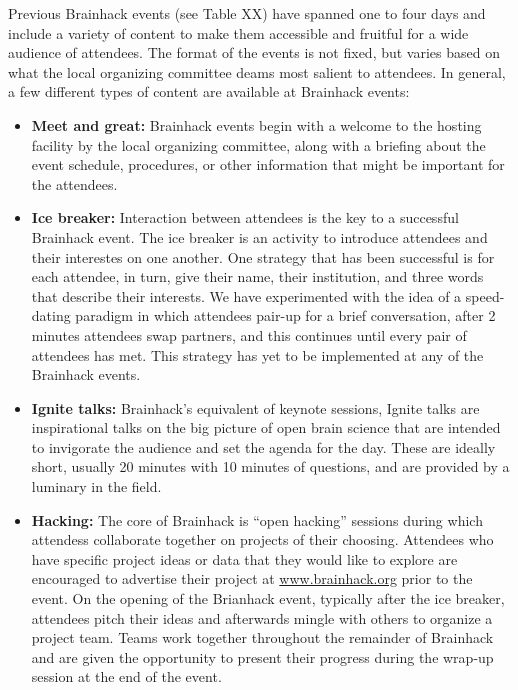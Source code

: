 \documentclass[11pt]{bmc_article_s50}
\providecommand{\tightlist}{%
  \setlength{\itemsep}{0pt}\setlength{\parskip}{0pt}}
\begin{document}
Previous Brainhack events (see Table XX) have spanned one to four days
and include a variety of content to make them accessible and fruitful
for a wide audience of attendees. The format of the events is not fixed,
but varies based on what the local organizing committee deams most
salient to attendees. In general, a few different types of content are
available at Brainhack events:

\begin{itemize}
\tightlist
\item
  \textbf{Meet and great:} Brainhack events begin with a welcome to the
  hosting facility by the local organizing committee, along with a
  briefing about the event schedule, procedures, or other information
  that might be important for the attendees.
\item
  \textbf{Ice breaker:} Interaction between attendees is the key to a
  successful Brainhack event. The ice breaker is an activity to
  introduce attendees and their interestes on one another. One strategy
  that has been successful is for each attendee, in turn, give their
  name, their institution, and three words that describe their
  interests. We have experimented with the idea of a speed-dating paradigm
  in which attendees pair-up for a brief conversation, after 2 minutes
  attendees swap partners, and this continues until every pair of
  attendees has met. This strategy has yet to be implemented at any of
  the Brainhack events.
\item
  \textbf{Ignite talks:} Brainhack's equivalent of keynote sessions,
  Ignite talks are inspirational talks on the big picture of open brain
  science that are intended to invigorate the audience and set the
  agenda for the day. These are ideally short, usually 20 minutes with
  10 minutes of questions, and are provided by a luminary in the field.
\item
  \textbf{Hacking:} The core of Brainhack is ``open hacking'' sessions
  during which attendess collaborate together on projects of their
  choosing. Attendees who have specific project ideas or data that they
  would like to explore are encouraged to advertise their project at
  \href{http://www.brainhack.org}{www.brainhack.org} prior to the event.
  On the opening of the Brianhack event, typically after the ice
  breaker, attendees pitch their ideas and afterwards mingle with others
  to organize a project team. Teams work together throughout the
  remainder of Brainhack and are given the opportunity to present their
  progress during the wrap-up session at the end of the event.

\end{itemize}
\end{document}
